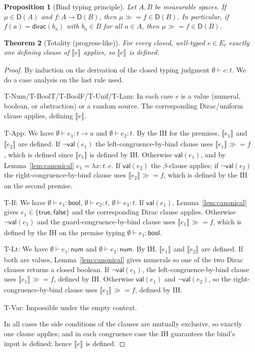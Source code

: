 \documentclass[11pt]{article}
\newtheorem{theorem}{Theorem}
\newtheorem{proposition}[theorem]{Proposition}
\newcommand{\D}{\mathsf{D}}
\newcommand{\dirac}{\mathsf{dirac}}
\newcommand{\bind}{\mathbin{\gg\!=}}
\newcommand{\sem}[2][]{\llbracket #2 \rrbracket_{#1}}
\newcommand{\E}[1]{E_{#1}}
\newcommand{\ty}[1]{\mathsf{#1}}
\newcommand{\bool}{\ty{bool}}
\newcommand{\num}{\ty{num}}
\newcommand{\arr}{\rightarrow}
\newcommand{\val}{\mathsf{val}}
\begin{document}
\begin{proposition}[Bind typing principle]\label{prop:bind-typing}
Let $A,B$ be measurable spaces.
If $\mu\in \D(A)$ and $f:A\to \D(B)$, then $\mu\bind f\in \D(B)$.
In particular, if $f(a)=\dirac(b_a)$ with $b_a\in B$ for all $a\in A$, then $\mu\bind f\in \D(B)$.
\end{proposition}

\begin{theorem}[Totality (progress-like)]\label{thm:total}
For every closed, well-typed $e\in \E{t}$ exactly one defining clause of $\sem{e}$ applies, so $\sem{e}$ is defined.
\end{theorem}
\begin{proof}
By induction on the derivation of the closed typing judgment $\emptyset\vdash e:t$.
We do a case analysis on the last rule used.

T-Num/T-BoolT/T-BoolF/T-Unif/T-Lam: In each case $e$ is a value (numeral, boolean, or abstraction) or a random source. The corresponding Dirac/uniform clause applies, defining $\sem{e}$.

T-App: We have $\emptyset\vdash e_1:t\arr u$ and $\emptyset\vdash e_2:t$. By the IH for the premises, $\sem{e_1}$ and $\sem{e_2}$ are defined.
If $\neg\val(e_1)$ the left-congruence-by-bind clause uses $\sem{e_1}\bind f$, which is defined since $\sem{e_1}$ is defined by IH. Otherwise $\val(e_1)$, and by Lemma~\ref{lem:canonical} $e_1=\lambda x{:}t.\,e$. If $\val(e_2)$ the $\beta$-clause applies; if $\neg\val(e_2)$ the right-congruence-by-bind clause uses $\sem{e_2}\bind f$, which is defined by the IH on the second premise.

T-If: We have $\emptyset\vdash e_1:\bool$, $\emptyset\vdash e_2:t$, $\emptyset\vdash e_3:t$. If $\val(e_1)$, Lemma~\ref{lem:canonical} gives $e_1\in\{\ty{true},\ty{false}\}$ and the corresponding Dirac clause applies. Otherwise $\neg\val(e_1)$ and the guard-congruence-by-bind clause uses $\sem{e_1}\bind f$, which is defined by the IH on the premise typing $\emptyset\vdash e_1:\bool$.

T-Lt: We have $\emptyset\vdash e_1:\num$ and $\emptyset\vdash e_2:\num$. By IH, $\sem{e_1}$ and $\sem{e_2}$ are defined. If both are values, Lemma~\ref{lem:canonical} gives numerals so one of the two Dirac clauses returns a closed boolean. If $\neg\val(e_1)$, the left-congruence-by-bind clause uses $\sem{e_1}\bind f$, defined by IH. Otherwise $\val(e_1)$ and $\neg\val(e_2)$, so the right-congruence-by-bind clause uses $\sem{e_2}\bind f$, defined by IH.

T-Var: Impossible under the empty context.

In all cases the side conditions of the clauses are mutually exclusive, so exactly one clause applies; and in each congruence case the IH guarantees the bind's input is defined; hence $\sem{e}$ is defined.
\end{proof}
\end{document}
